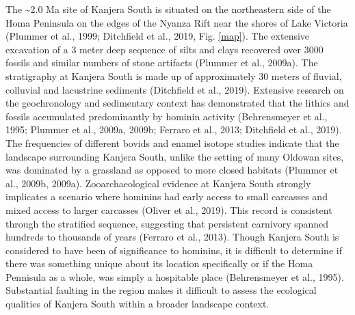 \documentclass[]{elsarticle} %
\begin{document}
The \textasciitilde{}2.0 Ma site of Kanjera South is situated on the
northeastern side of the Homa Peninsula on the edges of the Nyanza Rift
near the shores of Lake Victoria (Plummer et al., 1999; Ditchfield et
al., 2019, Fig. \ref{map}). The extensive excavation of a 3 meter deep
sequence of silts and clays recovered over 3000 fossils and similar
numbers of stone artifacts (Plummer et al., 2009a). The stratigraphy at
Kanjera South is made up of approximately 30 meters of fluvial,
colluvial and lacustrine sediments (Ditchfield et al., 2019). Extensive
research on the geochronology and sedimentary context has demonstrated
that the lithics and fossils accumulated predominantly by hominin
activity (Behrensmeyer et al., 1995; Plummer et al., 2009a, 2009b;
Ferraro et al., 2013; Ditchfield et al., 2019). The frequencies of
different bovids and enamel isotope studies indicate that the landscape
surrounding Kanjera South, unlike the setting of many Oldowan sites, was
dominated by a grassland as opposed to more closed habitats (Plummer et
al., 2009b, 2009a). Zooarchaeological evidence at Kanjera South strongly
implicates a scenario where hominins had early access to small carcasses
and mixed access to larger carcasses (Oliver et al., 2019). This record
is consistent through the stratified sequence, suggesting that
persistent carnivory spanned hundreds to thousands of years (Ferraro et
al., 2013). Though Kanjera South is considered to have been of
significance to hominins, it is difficult to determine if there was
something unique about its location specifically or if the Homa
Pennisula as a whole, was simply a hospitable place (Behrensmeyer et
al., 1995). Substantial faulting in the region makes it difficult to
assess the ecological qualities of Kanjera South within a broader
landscape context.
\end{document}
